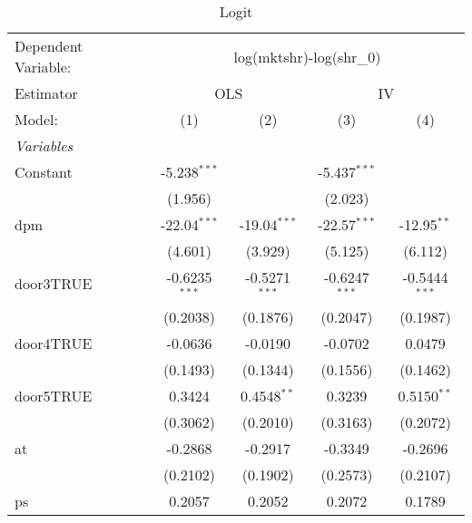 
\begin{table}[htbp]
   \caption{Logit}
   \centering
   \begin{tabular}{lcccc}
      \tabularnewline \midrule \midrule
      Dependent Variable: & \multicolumn{4}{c}{log(mktshr)-log(shr\_0)}\\
      Estimator & \multicolumn{2}{c}{OLS} & \multicolumn{2}{c}{IV} \\ 
      Model:                       & (1)             & (2)             & (3)                    & (4)\\  
      \midrule
      \emph{Variables}\\
      Constant                     & -5.238$^{***}$  &                 & -5.437$^{***}$         &   \\   
                                   & (1.956)         &                 & (2.023)                &   \\   
      dpm                          & -22.04$^{***}$  & -19.04$^{***}$  & -22.57$^{***}$         & -12.95$^{**}$\\   
                                   & (4.601)         & (3.929)         & (5.125)                & (6.112)\\   
      door3TRUE                    & -0.6235$^{***}$ & -0.5271$^{***}$ & -0.6247$^{***}$        & -0.5444$^{***}$\\   
                                   & (0.2038)        & (0.1876)        & (0.2047)               & (0.1987)\\   
      door4TRUE                    & -0.0636         & -0.0190         & -0.0702                & 0.0479\\   
                                   & (0.1493)        & (0.1344)        & (0.1556)               & (0.1462)\\   
      door5TRUE                    & 0.3424          & 0.4548$^{**}$   & 0.3239                 & 0.5150$^{**}$\\   
                                   & (0.3062)        & (0.2010)        & (0.3163)               & (0.2072)\\   
      at                           & -0.2868         & -0.2917         & -0.3349                & -0.2696\\   
                                   & (0.2102)        & (0.1902)        & (0.2573)               & (0.2107)\\   
      ps                           & 0.2057          & 0.2052          & 0.2072                 & 0.1789\\   

\end{tabular}
\end{table}
